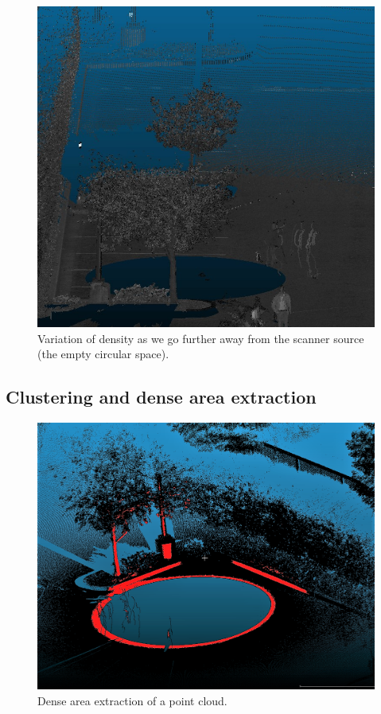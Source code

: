 \begin{figure}
  \centering
  \includegraphics[scale=0.7]{img/dens.jpg}
  \caption{Variation of density as we go further away from the scanner source (the empty circular space).}
  \label{fig:density}
\end{figure}


\subsection{Clustering and dense area extraction}
\label{subsc:highdens}
\begin{figure}
  \centering
  \includegraphics[scale=0.44]{img/highdens.png}
  \caption{Dense area extraction of a point cloud.}
  \label{fig:highdens}
\end{figure}


